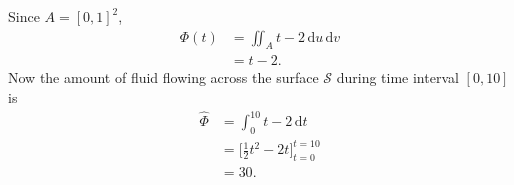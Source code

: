 \documentclass[12pt]{article}
\newcommand{\FF}{\hat{\Phi}}
\newcommand{\ddt}{\,\mathrm{d}t}
\newcommand{\ddu}{\, \mathrm{d}u}
\newcommand{\ddv}{\, \mathrm{d}v}
\begin{document}
Since $A = \left[ 0, 1 \right]^2$,
\begin{align*}
\Phi(t) &= \iint_A t - 2 \ddu \ddv \\
          &= t - 2.
\end{align*}
Now the amount of fluid flowing across the surface $\mathscr{S}$ during time interval $\left[  0, 10 \right]$ is
\begin{align*}
\FF &= \int_0^{10} t - 2 \ddt  \\
      &= \Big[ \frac{1}{2} t^2 - 2t \Big]_{t = 0}^{t = 10} \\
      &= 30.
\end{align*} 
\end{document}
